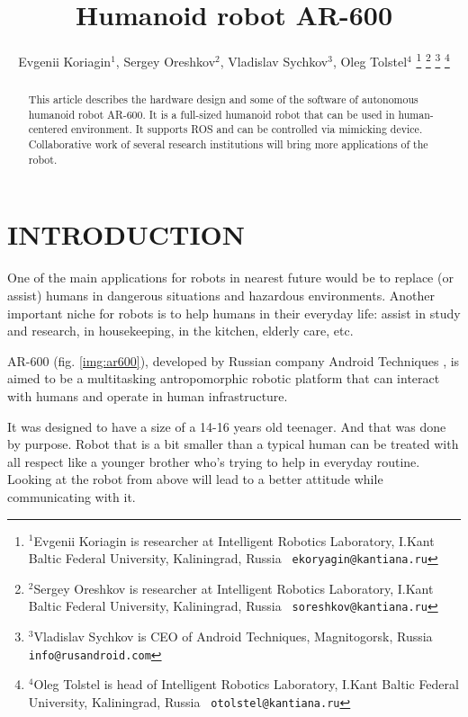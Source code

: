 \documentclass[letterpaper, 10 pt, conference]{ieeeconf}  %
\title{\LARGE \bf
Humanoid robot AR-600
}
\author{Evgenii Koriagin$^{1}$, Sergey Oreshkov$^{2}$, Vladislav
Sychkov$^{3}$, Oleg Tolstel$^{4}$%
\thanks{$^{1}$Evgenii Koriagin is researcher at Intelligent Robotics
Laboratory, I.Kant Baltic Federal University, Kaliningrad, Russia {\tt\small
ekoryagin@kantiana.ru}}%
\thanks{$^{2}$Sergey Oreshkov is researcher at Intelligent Robotics
Laboratory, I.Kant Baltic Federal University, Kaliningrad, Russia {\tt\small
soreshkov@kantiana.ru}}%
\thanks{$^{3}$Vladislav Sychkov is CEO of Android Techniques, Magnitogorsk,
Russia {\tt\small info@rusandroid.com}}%
\thanks{$^{4}$Oleg Tolstel is head of Intelligent Robotics
Laboratory, I.Kant Baltic Federal University, Kaliningrad, Russia {\tt\small
otolstel@kantiana.ru}}%
}
\begin{document}
\maketitle
\thispagestyle{empty}
\pagestyle{empty}


\begin{abstract}

This article describes the hardware design and some of the software of
autonomous humanoid robot AR-600. It is a full-sized humanoid robot that can be
used in human-centered environment. It supports ROS and can be controlled via
mimicking device. Collaborative work of several research institutions will bring
more applications of the robot.

\end{abstract}


\section{INTRODUCTION}

One of the main applications for robots in nearest future would be to replace
(or assist) humans in dangerous situations and hazardous environments. Another
important niche for robots is to help humans in their everyday life: assist in
study and research, in housekeeping, in the kitchen, elderly care, etc.

AR-600 (fig. \ref{img:ar600}), developed by Russian company Android Techniques
\cite{c1}, is aimed to be a multitasking antropomorphic robotic platform that
can interact with humans and operate in human infrastructure. 
   
It was designed to have a size of a 14-16 years old teenager. And that was done
by purpose. Robot that is a bit smaller than a typical human can be treated
with all respect like a younger brother who's trying to help in everyday
routine. Looking at the robot from above will lead to a better attitude while
communicating with it. 
  
\end{document}
